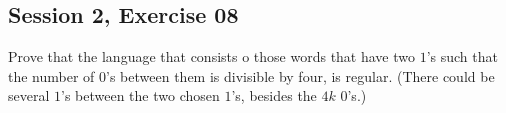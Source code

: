 \subsection{Session 2, Exercise 08}


Prove that the language that consists o those words that have two $1$'s such that the number of $0$'s between them is divisible by four, is regular. (There could be several $1$'s between the two chosen $1$'s, besides the $4k$ $0$'s.)


